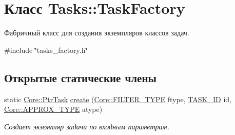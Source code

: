 \hypertarget{class_tasks_1_1_task_factory}{}\section{Класс Tasks\+:\+:Task\+Factory}
\label{class_tasks_1_1_task_factory}


Фабричный класс для создания экземпляров классов задач.  




{\ttfamily \#include \char`\"{}tasks\+\_\+factory.\+h\char`\"{}}

\subsection*{Открытые статические члены}
\begin{DoxyCompactItemize}
\item 
static \hyperlink{namespace_core_abfda8f69fcacfcea2696549b548ed737}{Core\+::\+Ptr\+Task} \hyperlink{class_tasks_1_1_task_factory_a9ee3c973c991afc1882edb7fe4eb4c63}{create} (\hyperlink{namespace_core_af88278693f3c866f217da796f4bb9af7}{Core\+::\+F\+I\+L\+T\+E\+R\+\_\+\+T\+Y\+PE} ftype, \hyperlink{namespace_tasks_acf6b541f8ce51b63eb9fcb8748317707}{T\+A\+S\+K\+\_\+\+ID} id, \hyperlink{namespace_core_acd67f53ff1d9b21fabb1da4474a8f7d9}{Core\+::\+A\+P\+P\+R\+O\+X\+\_\+\+T\+Y\+PE} atype)
\begin{DoxyCompactList}\small\item\em Создает экземпляр задачи по входным параметрам. \end{DoxyCompactList}\end{DoxyCompactItemize}
